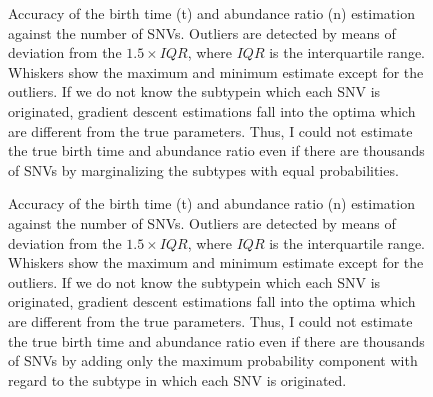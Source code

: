 \documentclass{article}
\begin{document}
\begin{figure}[H]
   \caption{
 Accuracy of the birth time (t) and abundance ratio (n) estimation against the number of SNVs. Outliers are detected by means of deviation from the $1.5 \times IQR$, where $IQR$ is the interquartile range. Whiskers show the maximum and minimum estimate except for the outliers. If we do not know the subtypein which each SNV is originated, gradient descent estimations fall into the optima which are different from the true parameters. Thus, I could not estimate the true birth time and abundance ratio even if there are thousands of SNVs by marginalizing the subtypes with equal probabilities.
  }
 \label{fig: binom_subtype_ungiven}
\end{figure}

\begin{figure}[H]
   \caption{
 Accuracy of the birth time (t) and abundance ratio (n) estimation against the number of SNVs. Outliers are detected by means of deviation from the $1.5 \times IQR$, where $IQR$ is the interquartile range. Whiskers show the maximum and minimum estimate except for the outliers. If we do not know the subtypein which each SNV is originated, gradient descent estimations fall into the optima which are different from the true parameters. Thus, I could not estimate the true birth time and abundance ratio even if there are thousands of SNVs by adding only the maximum probability component with regard to the subtype in which each SNV is originated.
  }
 \label{fig: binom_subtype_ungiven_mle}
\end{figure}
\end{document}
